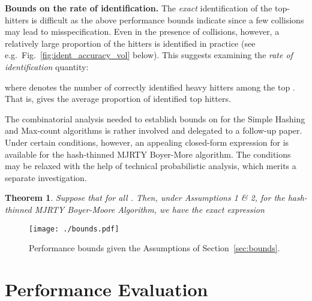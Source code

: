 \documentclass[10pt, conference, letterpaper,onecolumn]{IEEEtranv1.8}
\theoremstyle{plain}\newtheorem{thm}{Theorem}\newtheorem{lem}{Lemma}
\theoremstyle{definition}
\def\HideProof#1{}
\begin{document}
\smallskip
\noindent
{\bf Bounds on the rate of identification.} The {\em exact} identification of the top- hitters is difficult 
as the above performance bounds indicate since a few collisions may lead to misspecification. 
Even in the presence of collisions, however, a relatively large proportion of the hitters is identified 
in practice (see e.g.\ Fig.~\ref{fig:ident_accuracy_vol} below).  This suggests examining the 
{\em rate of identification} quantity:

where  denotes the number of correctly identified heavy hitters among the top . That is, 
gives the average proportion of identified top hitters.

The combinatorial analysis needed to establish bounds on  for the
Simple Hashing and Max-count algorithms is rather involved and delegated to a follow-up paper. Under certain
conditions, however,  an appealing closed-form expression for  is available for the hash-thinned MJRTY
Boyer-More algorithm. The conditions may be relaxed with the help of technical probabilistic analysis, which merits 
a separate investigation.

\begin{thm} Suppose that  for all . Then, under Assumptions 1 \& 2, for the hash-thinned MJRTY
Boyer-Moore Algorithm, we have the exact expression

\end{thm}
\HideProof{
\begin{proof} The assumption  guarantees that 
 equals the number of distinct values in the set of hashes .
Let  if bin  is occupied and  otherwise, for  Observe that

by exchangeability. Note, however, that 

since  are independent and Uniform.
This, in view of \eqref{e:e_r} and \eqref{e:bm-expected-1}, implies 
the first relation in \eqref{e:bm-expected}. The second follows from the standard
approximation 
\end{proof}}


\begin{figure}
         \vspace{-120pt}
        \centering
        \texttt{[image: ./bounds.pdf]}
         \vspace{-130pt}
        \caption{Performance bounds given the Assumptions of Section~\ref{sec:bounds}.}
        \label{fig:bounds}
 \end{figure}




\section{Performance Evaluation}
\end{document}
